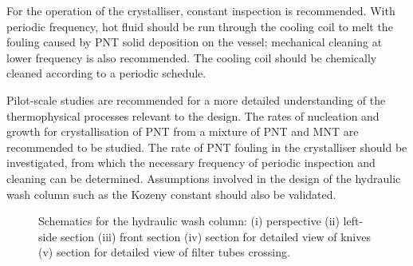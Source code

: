 For the operation of the crystalliser, constant inspection is recommended. With periodic frequency, hot fluid should be run through the cooling coil to melt the fouling caused by PNT solid deposition on the vessel; mechanical cleaning at lower frequency is also recommended. The cooling coil should be chemically cleaned according to a periodic schedule. 

Pilot-scale studies are recommended for a more detailed understanding of the thermophysical processes relevant to the design. The rates of nucleation and growth for crystallisation of PNT from a mixture of PNT and MNT are recommended to be studied. The rate of PNT fouling in the crystalliser should be investigated, from which the necessary frequency of periodic inspection and cleaning can be determined. Assumptions involved in the design of the hydraulic wash column such as the Kozeny constant should also be validated.   

\begin{figure}[H]
    \centering
    
    \caption{Schematics for the hydraulic wash column: (i) perspective (ii) left-side section (iii) front section (iv) section for detailed view of knives (v) section for detailed view of filter tubes crossing.}
    \label{fig:wash column schematic}
\end{figure}





